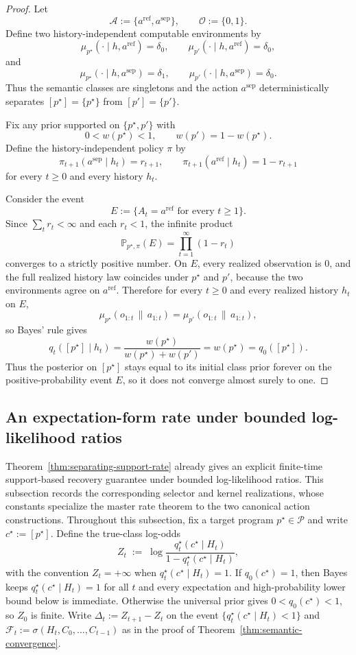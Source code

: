 \documentclass[11pt]{article}
\theoremstyle{definition}
\theoremstyle{remark}
\newcommand{\Acal}{\mathcal{A}}
\newcommand{\Ocal}{\mathcal{O}}
\newcommand{\Pcal}{\mathcal{P}}
\newcommand{\Prob}{\mathbb{P}}
\newcommand{\givena}{\,\|\,}
\begin{document}
\begin{proof}
Let
\[
\Acal:=\{a^{\mathrm{ref}},a^{\mathrm{sep}}\},
\qquad
\Ocal:=\{0,1\}.
\]
Define two history-independent computable environments by
\[
\mu_{p^\star}(\cdot\mid h,a^{\mathrm{ref}})=\delta_0,
\qquad
\mu_{p'}(\cdot\mid h,a^{\mathrm{ref}})=\delta_0,
\]
and
\[
\mu_{p^\star}(\cdot\mid h,a^{\mathrm{sep}})=\delta_1,
\qquad
\mu_{p'}(\cdot\mid h,a^{\mathrm{sep}})=\delta_0.
\]
Thus the semantic classes are singletons and the action $a^{\mathrm{sep}}$ deterministically separates $[p^\star]=\{p^\star\}$ from $[p']=\{p'\}$.

Fix any prior supported on $\{p^\star,p'\}$ with
\[
0<w(p^\star)<1,
\qquad
w(p')=1-w(p^\star).
\]
Define the history-independent policy $\pi$ by
\[
\pi_{t+1}(a^{\mathrm{sep}}\mid h_t)=r_{t+1},
\qquad
\pi_{t+1}(a^{\mathrm{ref}}\mid h_t)=1-r_{t+1}
\]
for every $t\ge 0$ and every history $h_t$.

Consider the event
\[
E:=\{A_t=a^{\mathrm{ref}}\text{ for every }t\ge 1\}.
\]
Since $\sum_t r_t<\infty$ and each $r_t<1$, the infinite product
\[
\Prob_{p^\star,\pi}(E)=\prod_{t=1}^{\infty}(1-r_t)
\]
converges to a strictly positive number. On $E$, every realized observation is $0$, and the full realized history law coincides under $p^\star$ and $p'$, because the two environments agree on $a^{\mathrm{ref}}$. Therefore for every $t\ge 0$ and every realized history $h_t$ on $E$,
\[
\mu_{p^\star}(o_{1:t}\givena a_{1:t})=\mu_{p'}(o_{1:t}\givena a_{1:t}),
\]
so Bayes' rule gives
\[
q_t([p^\star]\mid h_t)
=
\frac{w(p^\star)}{w(p^\star)+w(p')}
=
w(p^\star)
=
q_0([p^\star]).
\]
Thus the posterior on $[p^\star]$ stays equal to its initial class prior forever on the positive-probability event $E$, so it does not converge almost surely to one.
\end{proof}


\subsection{An expectation-form rate under bounded log-likelihood ratios}
\label{sec:exp-rate}

Theorem~\ref{thm:separating-support-rate} already gives an explicit finite-time support-based recovery guarantee under bounded log-likelihood ratios. This subsection records the corresponding selector and kernel realizations, whose constants specialize the master rate theorem to the two canonical action constructions. Throughout this subsection, fix a target program $p^\star\in\Pcal$ and write $c^\star:=[p^\star]$. Define the true-class log-odds
\[
Z_t\;:=\;\log\frac{q_t^\star(c^\star\mid H_t)}{1-q_t^\star(c^\star\mid H_t)},
\]
with the convention $Z_t=+\infty$ when $q_t^\star(c^\star\mid H_t)=1$. If $q_0(c^\star)=1$, then Bayes keeps $q_t^\star(c^\star\mid H_t)=1$ for all $t$ and every expectation and high-probability lower bound below is immediate. Otherwise the universal prior gives $0<q_0(c^\star)<1$, so $Z_0$ is finite. Write $\Delta_t:=Z_{t+1}-Z_t$ on the event $\{q_t^\star(c^\star\mid H_t)<1\}$ and $\mathcal F_t:=\sigma(H_t,C_0,\dots,C_{t-1})$ as in the proof of Theorem~\ref{thm:semantic-convergence}.
\end{document}
